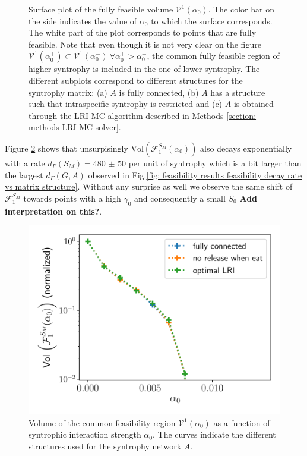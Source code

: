 \documentclass[12pt, titlepage]{report}
\begin{document}
\begin{figure}[h!]
\caption[caption for LOF]{Surface plot of the fully feasible volume $\mathcal{V}^1(\alpha_0)$. The color bar on the side indicates the value of $\alpha_0$ to which the surface corresponds. The white part of the plot corresponds to points that  are fully feasible. Note that even though it is not very clear on the figure $\mathcal{V}^1(\alpha_0^+) \subset \mathcal{V}^1(\alpha_0^-) \ \forall \alpha_0^+ > \alpha_0^-$, \ie the common fully feasible region of higher syntrophy is included in the one of lower syntrophy. The different subplots correspond to different structures for the syntrophy matrix: (a) $A$ is fully connected, (b) $A$ has a structure such that intraspecific syntrophy is restricted and (c) $A$ is obtained through the LRI MC algorithm described in Methods \ref{section: methods LRI MC solver}.} \label{fig: results feasibility cfv variation with syntrophy}
\end{figure}
Figure \ref{fig: feasibility results volume of cfr depending on syntrophy} shows that unsurpisingly $\text{Vol}\left(\mathcal{F}_1^{S_M}(\alpha_0)\right)$ also decays exponentially with a rate $d_F(S_M)=\num[scientific-notation=false]{480(50)}$ per unit of syntrophy which is a bit larger than the largest $d_F(G,A)$ observed in Fig.\ref{fig: feasibility results feasibility decay rate vs matrix structure}. Without any surprise as well we observe the same shift of $\mathcal{F}_1^{S_M}$ towards points with a high $\gamma_0$ and consequently a small $S_0$ \textbf{Add interpretation on this?}.


\begin{figure}
\centering
\includegraphics[width=0.7\linewidth]{measure_common_feasibility_volume_varying_syntrophy}
\caption{Volume of the common feasibility region $\mathcal{V}^1(\alpha_0)$ as a function of syntrophic interaction strength $\alpha_0$. The curves indicate the different structures used for the syntrophy network $A$.}\label{fig: feasibility results volume of cfr depending on syntrophy}
\end{figure}
\end{document}
